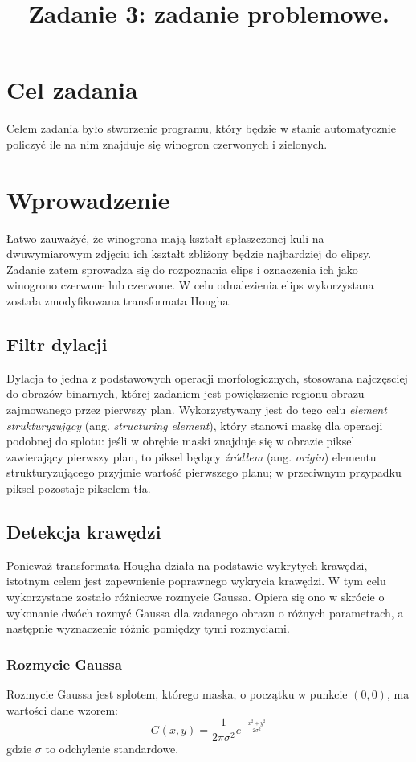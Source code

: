 \documentclass{classrep}
\author{%
  \studentinfo{Michał Janiszewski}{169485}
}
\title{Zadanie 3: zadanie problemowe.}
\begin{document}
\maketitle

\section{Cel zadania}
Celem zadania było stworzenie programu, który będzie w stanie automatycznie policzyć ile na nim znajduje się winogron czerwonych i zielonych.

\section{Wprowadzenie}
Łatwo zauważyć, że winogrona mają kształt spłaszczonej kuli \ppauza na dwuwymiarowym zdjęciu ich kształt zbliżony będzie najbardziej do elipsy. Zadanie zatem sprowadza się do rozpoznania elips i oznaczenia ich jako winogrono czerwone lub czerwone. W celu odnalezienia elips wykorzystana została zmodyfikowana transformata Hougha.

\subsection{Filtr dylacji}
Dylacja to jedna z podstawowych operacji morfologicznych, stosowana najczęsciej do obrazów binarnych, której zadaniem jest powiększenie regionu obrazu zajmowanego przez pierwszy plan. Wykorzystywany jest do tego celu \textit{element strukturyzujący} (ang. \textit{structuring element}), który stanowi maskę dla operacji podobnej do splotu: jeśli w obrębie maski znajduje się w obrazie piksel zawierający pierwszy plan, to piksel będący \textit{źródłem} (ang. \textit{origin}) elementu strukturyzującego przyjmie wartość pierwszego planu; w przeciwnym przypadku piksel pozostaje pikselem tła.

\subsection{Detekcja krawędzi}
Ponieważ transformata Hougha działa na podstawie wykrytych krawędzi, istotnym celem jest zapewnienie poprawnego wykrycia krawędzi. W tym celu wykorzystane zostało różnicowe rozmycie Gaussa. Opiera się ono w skrócie o wykonanie dwóch rozmyć Gaussa dla zadanego obrazu o różnych parametrach, a następnie wyznaczenie różnic pomiędzy tymi rozmyciami.

\subsubsection{Rozmycie Gaussa}
Rozmycie Gaussa jest splotem, którego maska, o początku w punkcie $(0, 0)$, ma wartości dane wzorem:
\begin{equation}
  G(x,y) = \frac{1}{2\pi \sigma^2}e^{-\frac{x^2 + y^2}{2\sigma^2}}
\end{equation}
gdzie $\sigma$ to odchylenie standardowe.
\end{document}
